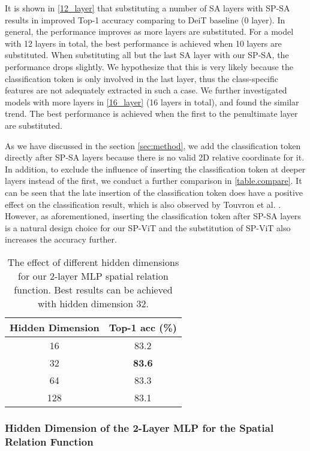\documentclass[authorversion, sigconf, acmthm=false, nonacm=true]{acmart}
\begin{document}
It is shown in \cref{12_layer} that substituting a number of SA layers with SP-SA results in improved Top-1 accuracy comparing to DeiT baseline (0 layer). In general, the performance improves as more layers are substituted. For a model with 12 layers in total, the best performance is achieved when 10 layers are substituted. When substituting all but the last SA layer with our SP-SA, the performance drops slightly.
We hypothesize that this is very likely because the classification token is only involved in the last layer, thus the class-specific features are not adequately extracted in such a case. We further investigated models with more layers in \cref{16_layer} (16 layers in total), and found the similar trend. The best performance is achieved when the first to the penultimate layer are substituted. 



As we have discussed in the section \ref{sec:method}, 
we add the classification token directly after SP-SA layers 
because there is no valid 2D relative coordinate for it. 
In addition, to exclude the influence of inserting the classification token at deeper layers instead of the first, 
we conduct a further comparison in \cref{table.compare}. 
It can be seen that the late insertion of the classification token does have a positive effect on
the classification result, which is also observed by Touvron et al. \cite{touvron2021going}. 
However, as aforementioned, inserting the classification token after SP-SA layers is a natural design choice for our SP-ViT 
and the substitution of SP-ViT also increases the accuracy further. 






\begin{table}[ht]
  \caption{The effect of different hidden dimensions for our 2-layer MLP spatial relation function. Best results can be achieved with hidden dimension 32.
  }
  \centering
\begin{tabular}{c|c}
         \toprule  
Hidden Dimension &   Top-1 acc (\%) \\
     \midrule
 16 & 83.2 \\ 
 32 & \textbf{83.6} \\ 
  64 & 83.3 \\
   128 & 83.1 \\ 
\bottomrule
  \end{tabular}
\label{table.mlp}
\end{table}
\subsubsection{Hidden Dimension of the 2-Layer MLP for the Spatial Relation Function}
\end{document}
